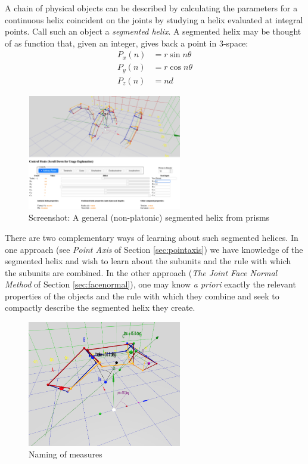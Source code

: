 \documentclass{svproc}
\begin{document}
A chain of physical objects can be described by
calculating
the parameters for a continuous helix coincident on the joints by studying
a helix evaluated at integral points. Call such an object a {\em segmented helix}.
A segmented helix may be thought of as function that, given an integer, gives back a point in
3-space:
\begin{align}
    P_x(n) &= r \sin{n \theta}  \\
    P_y(n) &= r \cos{n \theta} \\
   P_z(n) &= n d
\end{align}

\begin{figure}
    \centering
\includegraphics[width=0.6\textwidth]{figures/GeneralHelix.png}
\caption{Screenshot: A general (non-platonic) segmented helix from prisms\label{fig:prismatic}}
\end{figure}


There are two complementary ways of learning about such segmented helices.
In one approach (see {\em Point Axis} of Section \ref{sec:pointaxis})
we have knowledge of the segmented helix and
wish to learn about the subunits and the rule with which the subunits are combined.
In the other approach ({\em The Joint Face Normal Method} of Section \ref{sec:facenormal}),
one may know {\it a priori} exactly the
relevant properties of the objects and the rule with which they combine
and seek to compactly describe the segmented helix they create.

\begin{figure}
     \centering
          \includegraphics[width=0.6\textwidth]{figures/ABCDFigure.png}
     \caption{Naming of measures}
  \label{fig:naming}
\end{figure}
\end{document}
